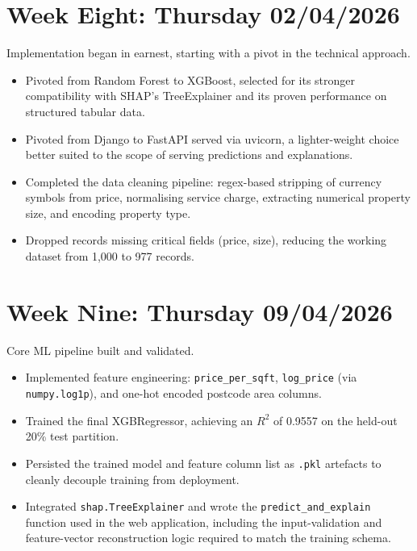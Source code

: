 \section*{Week Eight: Thursday 02/04/2026}
Implementation began in earnest, starting with a pivot in the technical approach.
\begin{itemize}
    \item Pivoted from Random Forest to XGBoost, selected for its stronger compatibility with SHAP's TreeExplainer and its proven performance on structured tabular data.
    \item Pivoted from Django to FastAPI served via uvicorn, a lighter-weight choice better suited to the scope of serving predictions and explanations.
    \item Completed the data cleaning pipeline: regex-based stripping of currency symbols from price, normalising service charge, extracting numerical property size, and encoding property type.
    \item Dropped records missing critical fields (price, size), reducing the working dataset from 1,000 to 977 records.
\end{itemize}

\section*{Week Nine: Thursday 09/04/2026}
Core ML pipeline built and validated.
\begin{itemize}
    \item Implemented feature engineering: \verb|price_per_sqft|, \verb|log_price| (via \verb|numpy.log1p|), and one-hot encoded postcode area columns.
    \item Trained the final XGBRegressor, achieving an $R^{2}$ of 0.9557 on the held-out 20\% test partition.
    \item Persisted the trained model and feature column list as \verb|.pkl| artefacts to cleanly decouple training from deployment.
    \item Integrated \verb|shap.TreeExplainer| and wrote the \verb|predict_and_explain| function used in the web application, including the input-validation and feature-vector reconstruction logic required to match the training schema.
\end{itemize}

